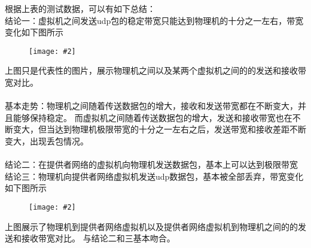 \documentclass[a4paper,left=1.5cm,right=1.5cm,11pt]{article}
\newcommand{\sizedfic}[2]{\begin{figure}[H]
		\center
		\texttt{[image: \#2]}
	\end{figure}}
\begin{document}
根据上表的测试数据，可以有如下总结：\\

结论一：虚拟机之间发送udp包的稳定带宽只能达到物理机的十分之一左右，带宽变化如下图所示\\
\sizedfic{0.9}{udp1.png}
上图只是代表性的图片，展示物理机之间以及某两个虚拟机之间的的发送和接收带宽对比。\\\\
基本走势：物理机之间随着传送数据包的增大，接收和发送带宽都在不断变大，并且能够保持稳定。
而虚拟机之间随着传送数据包的增大，发送和接收带宽也在不断变大，但当达到物理机极限带宽的十分之一左右之后，发送带宽和接收差距不断变大，出现丢包情况。\\\\
结论二：在提供者网络的虚拟机向物理机发送数据包，基本上可以达到极限带宽\\
结论三：物理机向提供者网络虚拟机发送udp数据包，基本被全部丢弃，带宽变化如下图所示\\
\sizedfic{0.9}{udp2.png}
上图展示了物理机到提供者网络虚拟机以及提供者网络虚拟机到物理机之间的的发送和接收带宽对比。
与结论二和三基本吻合。
\end{document}
